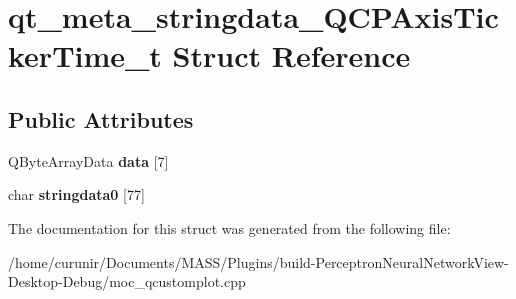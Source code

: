 \hypertarget{structqt__meta__stringdata___q_c_p_axis_ticker_time__t}{}\section{qt\+\_\+meta\+\_\+stringdata\+\_\+\+Q\+C\+P\+Axis\+Ticker\+Time\+\_\+t Struct Reference}
\label{structqt__meta__stringdata___q_c_p_axis_ticker_time__t}
\subsection*{Public Attributes}
\begin{DoxyCompactItemize}
\item 
Q\+Byte\+Array\+Data {\bfseries data} \mbox{[}7\mbox{]}\hypertarget{structqt__meta__stringdata___q_c_p_axis_ticker_time__t_a0e812edae0b72b531ae152e0bed2a3f5}{}\label{structqt__meta__stringdata___q_c_p_axis_ticker_time__t_a0e812edae0b72b531ae152e0bed2a3f5}

\item 
char {\bfseries stringdata0} \mbox{[}77\mbox{]}\hypertarget{structqt__meta__stringdata___q_c_p_axis_ticker_time__t_aad085a5c9bf7f31e1826758e85aebe4e}{}\label{structqt__meta__stringdata___q_c_p_axis_ticker_time__t_aad085a5c9bf7f31e1826758e85aebe4e}

\end{DoxyCompactItemize}


The documentation for this struct was generated from the following file\+:\begin{DoxyCompactItemize}
\item 
/home/curunir/\+Documents/\+M\+A\+S\+S/\+Plugins/build-\/\+Perceptron\+Neural\+Network\+View-\/\+Desktop-\/\+Debug/moc\+\_\+qcustomplot.\+cpp\end{DoxyCompactItemize}
